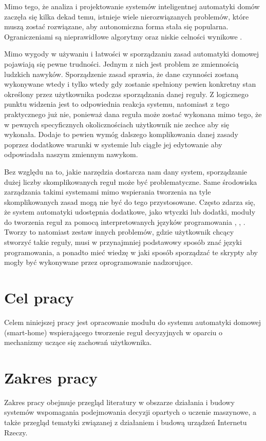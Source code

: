 Mimo tego, że analiza i projektowanie systemów inteligentnej automatyki domów zaczęła się kilka dekad temu, istnieje wiele nierozwiązanych problemów, które muszą zostać rozwiązane, aby autonomiczna forma stała się popularna. Ograniczeniami są nieprawidłowe algorytmy oraz niskie celności wynikowe \cite{episode_discovery_2}.

Mimo wygody w używaniu i łatwości w sporządzaniu zasad automatyki domowej pojawiają się pewne trudności. Jednym z nich jest problem ze zmiennością ludzkich nawyków. Sporządzenie zasad sprawia, że dane czynności zostaną wykonywane wtedy i tylko wtedy gdy zostanie spełniony pewien konkretny stan określony przez użytkownika podczas sporządzania danej reguły. Z logicznego punktu widzenia jest to odpowiednia reakcja systemu, natomiast z tego praktycznego już nie, ponieważ dana reguła może zostać wykonana mimo tego, że w pewnych specyficznych okolicznościach użytkownik nie zechce aby się wykonała. Dodaje to pewien wymóg dalszego komplikowania danej zasady poprzez dodatkowe warunki w systemie lub ciągłe jej edytowanie aby odpowiadała naszym zmiennym nawykom.

Bez względu na to, jakie narzędzia dostarcza nam dany system, sporządzanie dużej liczby skomplikowanych reguł może być problematyczne. Same środowiska zarządzania takimi systemami mimo wspierania tworzenia na tyle skomplikowanych zasad mogą nie być do tego przystosowane. Często zdarza się, że system automatyki udostępnia dodatkowe, jako wtyczki lub dodatki, moduły do tworzenia reguł za pomocą interpretowanych języków programowania \cite{appdaemon:main}, \cite{domoticz:scripts}, \cite{openhab:scripts}. Tworzy to natomiast zestaw innych problemów, gdzie użytkownik chcący stworzyć takie reguły, musi w przynajmniej podstawowy sposób znać języki programowania, a ponadto mieć wiedzę w jaki sposób sporządzać te skrypty aby mogły być wykonywane przez oprogramowanie nadzorujące.


\section{Cel pracy}
Celem niniejszej pracy jest opracowanie modułu do systemu automatyki domowej (smart-home) wspierającego tworzenie reguł decyzyjnych w oparciu o mechanizmy uczące się zachowań użytkownika.


\section{Zakres pracy}
Zakres pracy obejmuje przegląd literatury w obszarze działania i budowy systemów wspomagania podejmowania decyzji opartych o uczenie maszynowe, a także przegląd tematyki związanej z działaniem i budową urządzeń Internetu Rzeczy.
